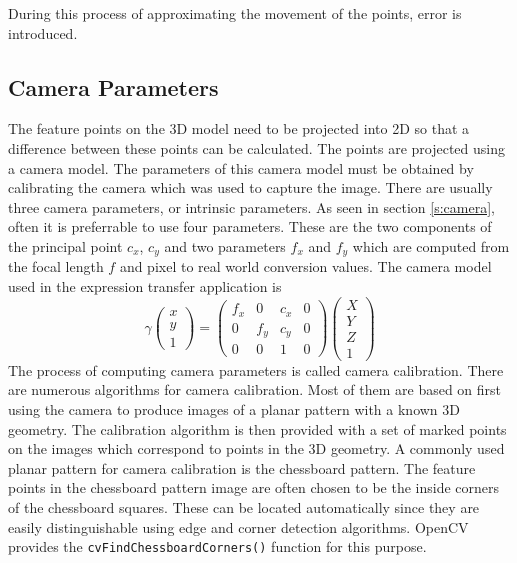 \documentclass[11pt,a4paper]{report}
\begin{document}
During this process of approximating the
movement of the points, error is introduced. 
\subsection{Camera Parameters}
The feature points on the 3D model need to be projected into 2D so that a
difference between these points can be calculated. The points are projected
using a camera model. The parameters of this camera model must be obtained by calibrating the camera which
was used to capture the image. There are usually three camera parameters, or intrinsic
parameters. As seen in section \ref{s:camera}, often it is preferrable to use
four parameters. These are the two components of the principal point $c_x$,
$c_y$ and two parameters $f_x$ and $f_y$ which are computed from the focal
length $f$ and pixel to real world conversion values. The camera model used in
the expression transfer application is
\begin{equation}\label{eq:projective}
\gamma\begin{pmatrix}x\\y\\1\end{pmatrix}
= \begin{pmatrix}f_x&0&c_x&0\\0&f_y&c_y&0\\0&0&1&0\end{pmatrix} \begin{pmatrix}X\\Y\\Z\\1\end{pmatrix}
\end{equation}
The process of computing camera parameters is called camera calibration. There
are numerous algorithms for camera calibration. Most of them are based on first
using the camera to produce images of a planar pattern with a known 3D geometry. The calibration algorithm is then
provided with a set of marked points on the images which correspond to points in
the 3D geometry. A commonly used planar pattern for camera calibration is
the chessboard pattern. The feature points in the chessboard pattern image are
often chosen to be the inside corners of the chessboard squares. These can
be located automatically since they are easily distinguishable using edge and
corner detection algorithms. OpenCV provides the
\texttt{cvFindChessboardCorners()} function for this purpose.
\end{document}
